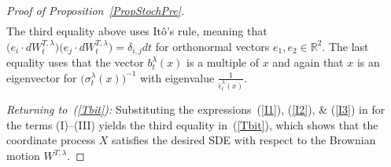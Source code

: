 \documentclass[10pt]{article}
\numberwithin{equation}{section}
\theoremstyle{definition}
\newcommand{\R}{{\mathbb R}}
\begin{document}
\begin{appendix}
\begin{proof}[Proof of Proposition~\ref{PropStochPre}]
\begin{align}
    \end{align}
  The third equality above uses It\^o's rule, meaning that $ \big(e_i\cdot d  W^{T,\lambda}_t\big)\big(e_j\cdot d  W^{T,\lambda}_t\big)=\delta_{i,j}dt $ for orthonormal vectors $e_1,e_2\in \R^2$.    The last equality uses that the vector $b_{t}^{\lambda}(x) $ is a multiple of $x$ and again that $x$  is an eigenvector for $\big(\sigma_{t}^{\lambda}(x)\big)^{-1}$ with eigenvalue  $\frac{1}{\check{\epsilon}_{t}^{\lambda}(x)  }  $.  \vspace{.2cm}
    
\noindent \textit{Returning to~(\ref{Tbit}):}  Substituting the  expressions~(\ref{I1}), (\ref{I2}), \& (\ref{I3}) in for the terms (I)--(III)     yields the third equality in~(\ref{Tbit}), which shows that the coordinate process $X$ satisfies the desired SDE with respect to the Brownian motion $W^{T,\lambda}$.
\end{proof}











\end{appendix}
\end{document}
